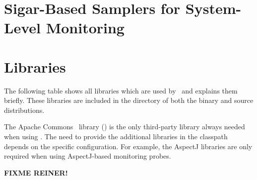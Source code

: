 \chapter{Sigar-Based Samplers for System-Level Monitoring}\label{appendix:SigarBasedSamplers}


\chapter{Libraries}\label{appendix:libraries}
    The following table shows all libraries which are used by \Kieker\ and explains them briefly. %
These libraries are included in the  directory of both the \Kieker{} binary and %
source distributions.

The Apache Commons~\cite{CommonsLogging-WebSite} library (\file{\commonsLoggingJar}) %
is the only third-party library always needed when using \Kieker{}. %
The need to provide the additional libraries in the classpath depends on the %
specific configuration. For example, the AspectJ libraries are only required %
when using AspectJ-based monitoring probes.

%
\textbf{FIXME REINER!}

